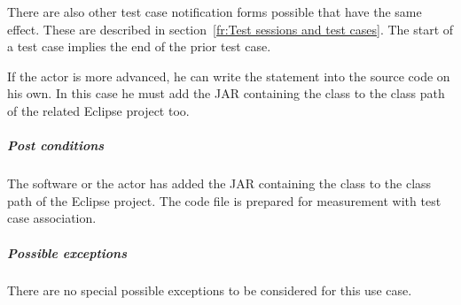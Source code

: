 \par
There are also other test case notification forms possible that have the same effect. These are described in section~\ref{fr:Test sessions and test cases}. The start of a test case implies the end of the prior test case.
\par
If the actor is more advanced, he can write the statement into the source code on his own. In this case he must add the JAR containing the  class to the class path of the related Eclipse project too.
\subparagraph{Post conditions}
The software or the actor has added the JAR containing the  class to the class path of the Eclipse project. The code file is prepared for measurement with test case association.
\subparagraph{Possible exceptions}
There are no special possible exceptions to be considered for this use case.


